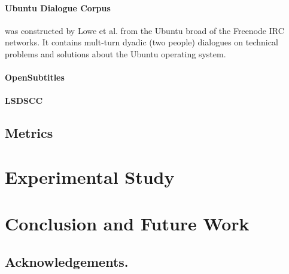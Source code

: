 \documentclass[runningheads]{llncs}
\begin{document}
\paragraph{Ubuntu Dialogue Corpus}
was constructed by Lowe et al. from
the Ubuntu broad of the Freenode IRC networks\cite{ubuntu_corpus}.
It contains mult-turn dyadic (two people) dialogues on technical problems and solutions
about the Ubuntu operating system.

\paragraph{OpenSubtitles}
\paragraph{LSDSCC}


\subsection{Metrics}


\section{Experimental Study}

\section{Conclusion and Future Work}

\subsection*{Acknowledgements.}
%


%
\end{document}

